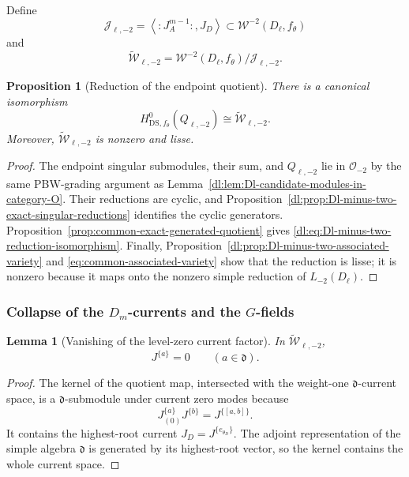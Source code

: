\documentclass[11pt,reqno]{amsart}
\newtheorem{lemma}[theorem]{Lemma}
\newtheorem{proposition}[theorem]{Proposition}
\theoremstyle{definition}
\theoremstyle{remark}
\begin{document}
Define
\begin{equation*}
  \mathcal J_{\ell,-2}
  =
  \left\langle:J_A^{m-1}:,J_D\right\rangle
  \subset\mathcal W^{-2}(D_\ell,f_\theta)
\end{equation*}
and
\begin{equation*}
  \widetilde{\mathcal W}_{\ell,-2}
  =
  \mathcal W^{-2}(D_\ell,f_\theta)/\mathcal J_{\ell,-2}.
\end{equation*}

\begin{proposition}[Reduction of the endpoint quotient]
\label{dl:prop:Dl-minus-two-reduction-candidate}
There is a canonical isomorphism
\begin{equation}
  H^0_{\mathrm{DS},f_\theta}(Q_{\ell,-2})
  \cong
  \widetilde{\mathcal W}_{\ell,-2}.
  \label{dl:eq:Dl-minus-two-reduction-isomorphism}
\end{equation}
Moreover, \(\widetilde{\mathcal W}_{\ell,-2}\) is nonzero and lisse.
\end{proposition}

\begin{proof}
The endpoint singular submodules, their sum, and $Q_{\ell,-2}$ lie in
$\mathcal O_{-2}$ by the same PBW-grading argument as
Lemma~\ref{dl:lem:Dl-candidate-modules-in-category-O}.  Their reductions are
cyclic, and Proposition~\ref{dl:prop:Dl-minus-two-exact-singular-reductions}
identifies the cyclic generators.  Proposition~\ref{prop:common-exact-generated-quotient}
gives \eqref{dl:eq:Dl-minus-two-reduction-isomorphism}.  Finally,
Proposition~\ref{dl:prop:Dl-minus-two-associated-variety} and
\eqref{eq:common-associated-variety} show that the reduction is lisse; it is
nonzero because it maps onto the nonzero simple reduction of
$L_{-2}(D_\ell)$.
\end{proof}

\subsubsection{Collapse of the \(D_m\)-currents and the \(G\)-fields}


\begin{lemma}[Vanishing of the level-zero current factor]
\label{dl:lem:Dl-minus-two-D-currents-vanish}
In \(\widetilde{\mathcal W}_{\ell,-2}\),
\begin{equation*}
  J^{\{a\}}=0
  \qquad
  (a\in\mathfrak d).
\end{equation*}
\end{lemma}

\begin{proof}
The kernel of the quotient map, intersected with the weight-one
\(\mathfrak d\)-current space, is a \(\mathfrak d\)-submodule under
current zero modes because
\[
  J^{\{a\}}_{(0)}J^{\{b\}}=J^{\{[a,b]\}}.
\]
It contains the highest-root current
\(J_D=J^{\{e_{\theta_D}\}}\).  The adjoint representation of the
simple algebra \(\mathfrak d\) is generated by its highest-root
vector, so the kernel contains the whole current space.
\end{proof}
\end{document}

